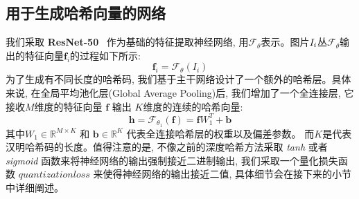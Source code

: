 \subsection{用于生成哈希向量的网络}
我们采取 \textbf{ResNet-50}~\cite{he2016deep} 作为基础的特征提取神经网络, 用$\mathcal{F}_{\theta}$表示。图片$\it{I}_i$丛$\mathcal{F}_{\theta}$输出的特征向量$\mathbf{f}_i$的过程如下所示:
\begin{equation}
    \mathbf{f}_i = \mathcal{F}_{\theta}(I_i)
\end{equation}
为了生成有不同长度的哈希码, 我们基于主干网络设计了一个额外的哈希层。具体来说, 在全局平均池化层(Global Average Pooling)后, 我们增加了一个全连接层, 它接收$M$维度的特征向量 $\mathbf{f}$ 输出 $K$维度的连续的哈希向量:
\begin{equation}
    \mathbf{h} = \mathcal{F}_{\theta_1}(\mathbf{f}) = \mathbf{f}W_1^T + \textbf{b}
\end{equation}
其中$W_1 \in \mathbb{R}^{M\times K}$ 和 $\mathbf{b} \in \mathbb{R}^{K}$ 代表全连接哈希层的权重以及偏差参数。 而$K$是代表汉明哈希码的长度。值得注意的是, 不像之前的深度哈希方法采取 \textit{tanh} 或者 \textit{sigmoid} 函数来将神经网络的输出强制接近二进制输出, 我们采取一个量化损失函数 $quantization loss$ 来使得神经网络的输出接近二值, 具体细节会在接下来的小节中详细阐述。
